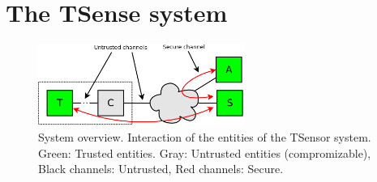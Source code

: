 \section{The TSense system}

\begin{figure}
\begin{center}
\includegraphics[width=0.6\textwidth]{../figures/sys-overview.png} 
\end{center}
\caption{System overview. Interaction of the entities of the TSensor system. Green: Trusted entities. Gray: Untrusted entities (compromizable), Black channels: Untrusted, Red channels: Secure.}
\label{fig:sys-overview}
\end{figure}

